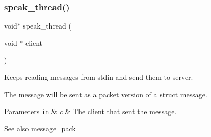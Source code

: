 \subsubsection{\texorpdfstring{speak\+\_\+thread()}{speak\_thread()}}
{\footnotesize\ttfamily void$\ast$ speak\+\_\+thread (\begin{DoxyParamCaption}\item[{void $\ast$}]{client }\end{DoxyParamCaption})}



Keeps reading messages from {\ttfamily stdin} and send them to server. 

The message will be sent as a packet version of a struct message.


\begin{DoxyParams}[1]{Parameters}
\mbox{\tt in}  & {\em c} & The client that sent the message.\\
\hline
\end{DoxyParams}
\begin{DoxySeeAlso}{See also}
\hyperlink{message_8h_a0e07715664284f7a821216ca83317e60}{message\+\_\+pack} 
\end{DoxySeeAlso}
